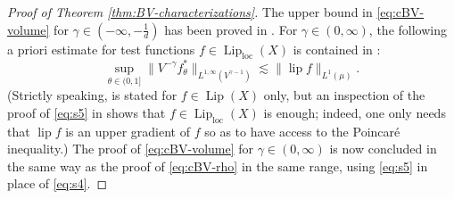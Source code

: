 \documentclass[11pt]{amsart}
\theoremstyle{definition}
\theoremstyle{remark}
\numberwithin{equation}{section}
\newcommand{\Norm}[2]{\|#1\|_{#2}}
\begin{document}
\begin{proof}[Proof of Theorem \ref{thm:BV-characterizations}]
The upper bound in \eqref{eq:cBV-volume} for
$\gamma\in(-\infty,-\frac1d)$ has been proved in \cite[(6.1)]{DLYYZ}.
For $\gamma\in(0,\infty)$, the following a priori estimate for test functions
$f\in \operatorname{Lip}_{\mathrm{loc}}(X)$ is contained in \cite[Theorem 1.8]{DLYYZ}:
\begin{equation}\label{eq:s5}
  \sup_{\theta\in(0,1]}\Norm{V^{-\gamma}f^{*}_\theta}{L^{1,\infty}(V^{\gamma-1})}
  \lesssim\Norm{{\operatorname{lip}}f}{L^1(\mu)}.
\end{equation}
(Strictly speaking, \cite[Theorem 1.8]{DLYYZ} is stated for $f\in \operatorname{Lip}(X)$
only,
but an inspection of the proof of \eqref{eq:s5} in \cite[Section 4.2]{DLYYZ} shows that
$f\in \operatorname{Lip}_{\mathrm{loc}}(X)$ is enough; indeed, one only needs that
$\operatorname{lip}f$
is an upper gradient of $f$ so as to have access to the Poincar\'e inequality.)
The proof of \eqref{eq:cBV-volume} for $\gamma\in(0,\infty)$ is now concluded in the
same way as the proof of \eqref{eq:cBV-rho} in the same range, using \eqref{eq:s5} in place
of
\eqref{eq:s4}.


\end{proof}
\end{document}
